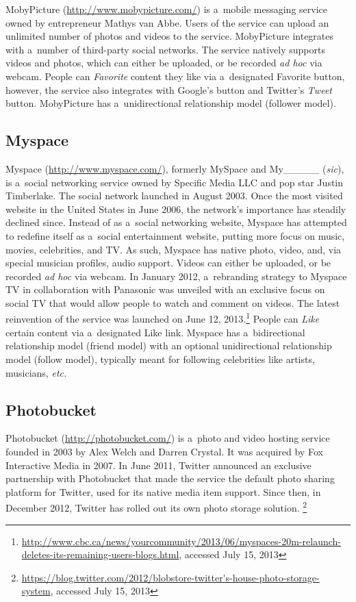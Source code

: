 MobyPicture (\url{http://www.mobypicture.com/})
is a~mobile messaging service
owned by entrepreneur Mathys van Abbe.
Users of the service can upload an unlimited number of
photos and videos to the service.
MobyPicture integrates with a~number of
third-party social networks.
The service natively supports videos and photos,
which can either be uploaded, or be recorded \emph{ad hoc}
via webcam.
People can \emph{Favorite} content they like via
a~designated Favorite button,
however, the service also integrates with Google's
\emph{\plusone} button and Twitter's \emph{Tweet} button. 
MobyPicture has a~unidirectional relationship model
(follower model).

\subsection{Myspace}

Myspace (\url{http://www.myspace.com/}),
formerly MySpace and My\_\_\_\_\_ (\emph{sic}), is
a~social networking service owned by Specific Media LLC
and pop star Justin Timberlake.
The social network launched in August 2003.
Once the most visited website
in the United States in June 2006,
the network's importance has steadily declined since.
Instead of as a~social networking website,
Myspace has attempted to redefine itself
as a~social entertainment website,
putting more focus on music, movies, celebrities, and TV.
As such, Myspace has native photo, video, and,
via special musician profiles, audio support.
Videos can either be uploaded,
or be recorded \emph{ad hoc} via webcam.
In January 2012, a~rebranding strategy to Myspace TV
in collaboration with Panasonic was unveiled
with an exclusive focus on social TV that would allow people
to watch and comment on videos.
The latest reinvention of the service was launched on June 12, 2013.\footnote{\url{http://www.cbc.ca/news/yourcommunity/2013/06/myspaces-20m-relaunch-deletes-its-remaining-users-blogs.html},
accessed July 15, 2013}
People can \emph{Like} certain content via a~designated Like link.
Myspace has a~bidirectional relationship model (friend model)
with an optional unidirectional relationship model (follow model),
typically meant for following celebrities like artists,
musicians, \emph{etc.}

\subsection{Photobucket}

Photobucket (\url{http://photobucket.com/})
is a~photo and video hosting service
founded in 2003 by Alex Welch and Darren Crystal.
It was acquired by Fox Interactive Media in 2007.
In June 2011, Twitter announced an exclusive partnership
with Photobucket that made the service
the default photo sharing platform for Twitter,
used for its native media item support.
Since then, in December 2012,
Twitter has rolled out its own photo storage solution.%
\footnote{\url{https://blog.twitter.com/2012/blobstore-twitter's-house-photo-storage-system}, accessed July 15, 2013}


